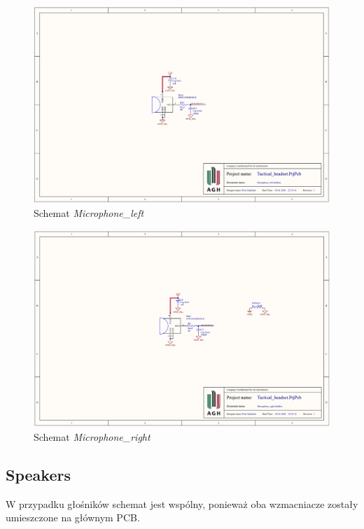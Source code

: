\pagebreak
\begin{figure}[H]
	\centering
	\includegraphics[scale=0.4]{zdjecia/PCB/mic_left.png}
	\caption{\label{mic_left} Schemat \textit{Microphone\_left}}
\end{figure}

\begin{figure}[H]
	\centering
	\includegraphics[scale=0.4]{zdjecia/PCB/mic_right.png}
	\caption{\label{mic_right} Schemat \textit{Microphone\_right}}
\end{figure}


\subsection{Speakers}

W przypadku głośników schemat jest wspólny, ponieważ oba wzmacniacze zostały umieszczone na głównym PCB.


